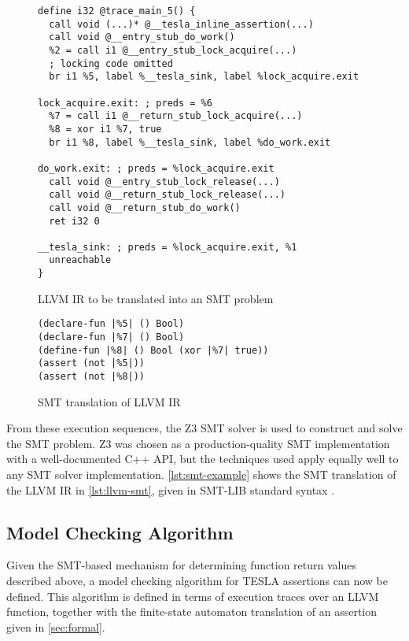 \begin{figure}
  \begin{verbatim}
define i32 @trace_main_5() {
  call void (...)* @__tesla_inline_assertion(...)
  call void @__entry_stub_do_work()
  %2 = call i1 @__entry_stub_lock_acquire(...)
  ; locking code omitted
  br i1 %5, label %__tesla_sink, label %lock_acquire.exit

lock_acquire.exit: ; preds = %6
  %7 = call i1 @__return_stub_lock_acquire(...)
  %8 = xor i1 %7, true
  br i1 %8, label %__tesla_sink, label %do_work.exit

do_work.exit: ; preds = %lock_acquire.exit
  call void @__entry_stub_lock_release(...)
  call void @__return_stub_lock_release(...)
  call void @__return_stub_do_work()
  ret i32 0

__tesla_sink: ; preds = %lock_acquire.exit, %1
  unreachable
}
  \end{verbatim}
  \caption{LLVM IR to be translated into an SMT problem}
  \label{lst:llvm-smt}
\end{figure}

\begin{figure}
  \begin{verbatim}
(declare-fun |%5| () Bool)
(declare-fun |%7| () Bool)
(define-fun |%8| () Bool (xor |%7| true))
(assert (not |%5|))
(assert (not |%8|))
  \end{verbatim}
  \caption{SMT translation of LLVM IR}
  \label{lst:smt-example}
\end{figure}

From these execution sequences, the Z3 SMT solver \cite{de_moura_z3:_2008} is
used to construct and solve the SMT problem. Z3 was chosen as a
production-quality SMT implementation with a well-documented C++ API, but the
techniques used apply equally well to any SMT solver implementation.
\autoref{lst:smt-example} shows the SMT translation of the LLVM IR in
\autoref{lst:llvm-smt}, given in SMT-LIB standard syntax \cite{BarST-SMT-10}.

\subsection{Model Checking Algorithm} \label{sec:mc}

Given the SMT-based mechanism for determining function return values described
above, a model checking algorithm for TESLA assertions can now be defined. This
algorithm is defined in terms of execution traces over an LLVM function,
together with the finite-state automaton translation of an assertion given in
\autoref{sec:formal}.

